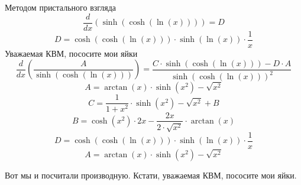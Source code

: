 \documentclass[12pt, a4paper]{article}
\begin{document}
Методом пристального взгляда
\begin{equation}
\frac{d}{dx}(\sinh(\cosh(\ln(x)))) = D
\end{equation}
$$D = \cosh(\cosh(\ln(x))) \cdot \sinh(\ln(x)) \cdot \frac{1}{x}$$
Уважаемая КВМ, пососите мои яйки
\begin{equation}
\frac{d}{dx}(\frac{A}{\sinh(\cosh(\ln(x)))}) = \frac{C \cdot \sinh(\cosh(\ln(x)))-D \cdot A}{{\sinh(\cosh(\ln(x)))}^{2}}
\end{equation}
$$A = \arctan(x) \cdot \sinh({x}^{2})-\sqrt{{x}^{2}}$$
$$C = \frac{1}{1+{x}^{2}} \cdot \sinh({x}^{2})-\sqrt{{x}^{2}}+B$$
$$B = \cosh({x}^{2}) \cdot 2x-\frac{2x}{2 \cdot \sqrt{{x}^{2}}} \cdot \arctan(x)$$
$$D = \cosh(\cosh(\ln(x))) \cdot \sinh(\ln(x)) \cdot \frac{1}{x}$$
$$A = \arctan(x) \cdot \sinh({x}^{2})-\sqrt{{x}^{2}}$$


Вот мы и посчитали производную. Кстати, уважаемая КВМ, пососите мои яйки.
\end{document}
